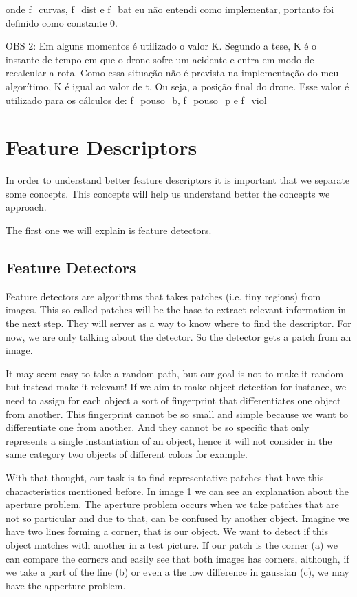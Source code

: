 \documentclass{article}
\begin{document}
onde f_curvas, f_dist e f_bat eu não entendi como implementar, portanto foi definido como constante 0.




OBS 2:
Em alguns momentos é utilizado o valor K. Segundo a tese, K é o instante de tempo em que o drone sofre um acidente e entra em modo de recalcular a rota.
Como essa situação não é prevista na implementação do meu algorítimo, K é igual ao valor de t. Ou seja, a posição final do drone.
Esse valor é utilizado para os cálculos de: f_pouso_b, f_pouso_p e f_viol 












\section{Feature Descriptors}


In order to understand better feature descriptors it is important that we separate some concepts. This concepts will help us understand better the concepts we approach.

The first one we will explain is feature detectors.

\subsection{Feature Detectors}
Feature detectors are algorithms that takes patches (i.e. tiny regions) from images. This so called patches will be the base to extract relevant information in the next step. They will server as a way to know where to find the descriptor. For now, we are only talking about the detector. So the detector gets a patch from an image.

It may seem easy to take a random path, but our goal is not to make it random but instead make it relevant! If we aim to make object detection for instance, we need to assign for each object a sort of fingerprint that differentiates one object from another. This fingerprint cannot be so small and simple because we want to differentiate one from another. And they cannot be so specific that only represents a single instantiation of an object, hence it will not consider in the same category two objects of different colors for example.

With that thought, our task is to find representative patches that have this characteristics mentioned before. In image 1 we can see an explanation about the aperture problem. The aperture problem occurs when we take patches that are not so particular and due to that, can be confused by another object. Imagine we have two lines forming a corner, that is our object. We want to detect if this object matches with another in a test picture. If our patch is the corner (a) we can compare the corners and easily see that both images has corners, although, if we take a part of the line (b) or even a the low difference in gaussian (c), we may have the apperture problem.
\end{document}
